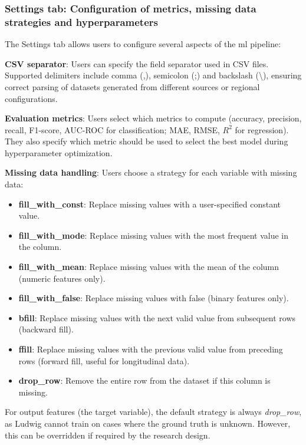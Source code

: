 \documentclass[twoside,final]{Contexto}
\begin{document}
\subsubsection{Settings tab: Configuration of metrics, missing data strategies and hyperparameters}

The Settings tab allows users to configure several aspects of the \gls{ml} pipeline:

\textbf{CSV separator}: Users can specify the field separator used in CSV files. Supported delimiters include comma (,), semicolon (;) and backslash (\textbackslash), ensuring correct parsing of datasets generated from different sources or regional configurations.

\textbf{Evaluation metrics}: Users select which metrics to compute (accuracy, precision, recall, F1-score, AUC-ROC for classification; MAE, RMSE, $R^2$ for regression). They also specify which metric should be used to select the best model during hyperparameter optimization.

\textbf{Missing data handling}: Users choose a strategy for each variable with missing data:

\begin{itemize}
    \item \textbf{fill\_with\_const}: Replace missing values with a user-specified constant value.
    \item \textbf{fill\_with\_mode}: Replace missing values with the most frequent value in the column.
    \item \textbf{fill\_with\_mean}: Replace missing values with the mean of the column (numeric features only).
    \item \textbf{fill\_with\_false}: Replace missing values with false (binary features only).
    \item \textbf{bfill}: Replace missing values with the next valid value from subsequent rows (backward fill).
    \item \textbf{ffill}: Replace missing values with the previous valid value from preceding rows (forward fill, useful for longitudinal data).
    \item \textbf{drop\_row}: Remove the entire row from the dataset if this column is missing.
\end{itemize}

For output features (the target variable), the default strategy is always \textit{drop\_row}, as Ludwig cannot train on cases where the ground truth is unknown. However, this can be overridden if required by the research design.
\end{document}
